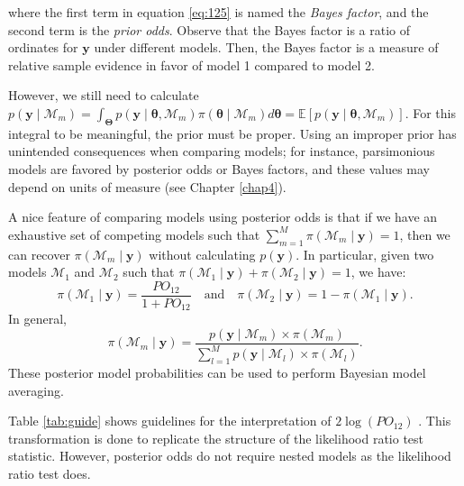 where the first term in equation \ref{eq:125} is named the \textit{Bayes factor}, and the second term is the \textit{prior odds}. Observe that the Bayes factor is a ratio of ordinates for \( \mathbf{y} \) under different models. Then, the Bayes factor is a measure of relative sample evidence in favor of model 1 compared to model 2.

However, we still need to calculate \( p(\mathbf{y}\mid \mathcal{M}_m) = \int_{\mathbf{\Theta}} p(\mathbf{y}\mid \bm{\theta}, \mathcal{M}_m) \pi(\bm{\theta}\mid \mathcal{M}_m) d\bm{\theta} = \mathbb{E}\left[ p(\mathbf{y}\mid \bm{\theta}, \mathcal{M}_m) \right] \). For this integral to be meaningful, the prior must be proper. Using an improper prior has unintended consequences when comparing models; for instance, parsimonious models are favored by posterior odds or Bayes factors, and these values may depend on units of measure (see Chapter \ref{chap4}).

A nice feature of comparing models using posterior odds is that if we have an exhaustive set of competing models such that \( \sum_{m=1}^M \pi(\mathcal{M}_m \mid \mathbf{y}) = 1 \), then we can recover \( \pi(\mathcal{M}_m \mid \mathbf{y}) \) without calculating \( p(\mathbf{y}) \). In particular, given two models \( \mathcal{M}_1 \) and \( \mathcal{M}_2 \) such that \( \pi(\mathcal{M}_1 \mid \mathbf{y}) + \pi(\mathcal{M}_2 \mid \mathbf{y}) = 1 \), we have:
\[
\pi(\mathcal{M}_1 \mid \mathbf{y}) = \frac{PO_{12}}{1 + PO_{12}} \quad \text{and} \quad \pi(\mathcal{M}_2 \mid \mathbf{y}) = 1 - \pi(\mathcal{M}_1 \mid \mathbf{y}).
\]
In general,
\[
\pi(\mathcal{M}_m \mid \mathbf{y}) = \frac{p(\mathbf{y} \mid \mathcal{M}_m) \times \pi(\mathcal{M}_m)}{\sum_{l=1}^M p(\mathbf{y} \mid \mathcal{M}_l) \times \pi(\mathcal{M}_l)}.
\]
These posterior model probabilities can be used to perform Bayesian model averaging.

Table \ref{tab:guide} shows guidelines for the interpretation of \( 2\log(PO_{12}) \) \cite{Kass1995}. This transformation is done to replicate the structure of the likelihood ratio test statistic. However, posterior odds do not require nested models as the likelihood ratio test does.

